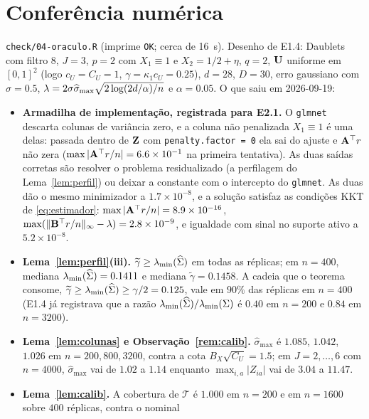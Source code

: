 \documentclass[11pt,a4paper]{article}
\newcommand{\lmin}{\lambda_{\min}}
\newcommand{\Amat}{\mathbf{A}}
\newcommand{\Bmat}{\mathbf{B}}
\newcommand{\smax}{\widehat{\sigma}_{\max}}
\newcommand{\gtil}{\widetilde{\gamma}}
\begin{document}
\section{Conferência numérica}

\texttt{check/04-oraculo.R} (imprime \texttt{OK}; cerca de 16~s). Desenho de
E1.4: Daublets com filtro 8, $J = 3$, $p = 2$ com $X_{1}\equiv 1$ e
$X_{2} = 1/2+\eta$, $q = 2$, $\mathbf{U}$ uniforme em $[0,1]^{2}$ (logo
$c_{U} = C_{U} = 1$, $\gamma = \kappa_{1}c_{U} = 0.25$), $d = 28$, $D = 30$,
erro gaussiano com $\sigma = 0.5$, $\pen = 2\sigma\smax\sqrt{2\log(2d/\alpha)/n}$
e $\alpha = 0.05$. O que saiu em 2026-09-19:

\begin{itemize}[nosep, leftmargin=*]
  \item \textbf{Armadilha de implementação, registrada para E2.1.} O
    \texttt{glmnet} descarta colunas de variância zero, e a coluna não
    penalizada $X_{1}\equiv 1$ é uma delas: passada dentro de $\mathbf{Z}$ com
    \texttt{penalty.factor = 0} ela sai do ajuste e $\Amat\T r$ não zera
    ($\max|\Amat\T r/n| = 6.6\times10^{-1}$ na primeira tentativa). As duas
    saídas corretas são resolver o problema residualizado (a perfilagem do
    Lema~\ref{lem:perfil}) ou deixar a constante com o intercepto do
    \texttt{glmnet}. As duas dão o mesmo minimizador a $1.7\times10^{-8}$, e
    a solução satisfaz as condições KKT de \eqref{eq:estimador}:
    $\max|\Amat\T r/n| = 8.9\times10^{-16}$,
    $\max(\lVert\Bmat\T r/n\rVert_{\infty} - \pen) = 2.8\times10^{-9}$, e
    igualdade com sinal no suporte ativo a $5.2\times10^{-8}$.
  \item \textbf{Lema~\ref{lem:perfil}(iii).} $\gtil \ge \lmin(\Gramhat)$ em
    todas as réplicas; em $n = 400$, mediana $\lmin(\Gramhat) = 0.1411$ e
    mediana $\gtil = 0.1458$. A cadeia que o teorema consome,
    $\gtil \ge \lmin(\Gramhat) \ge \gamma/2 = 0.125$, vale em $90\%$ das
    réplicas em $n = 400$ (E1.4 já registrava que a razão
    $\lmin(\Gramhat)/\lmin(\Gram)$ é $0.40$ em $n = 200$ e $0.84$ em
    $n = 3200$).
  \item \textbf{Lema~\ref{lem:colunas} e Observação~\ref{rem:calib}.} $\smax$
    é $1.085$, $1.042$, $1.026$ em $n = 200, 800, 3200$, contra a cota
    $B_{X}\sqrt{C_{U}} = 1.5$; em $J = 2,\dots,6$ com $n = 4000$, $\smax$ vai
    de $1.02$ a $1.14$ enquanto $\max_{i,a}|Z_{ia}|$ vai de $3.04$ a $11.47$.
  \item \textbf{Lema~\ref{lem:calib}.} A cobertura de $\mathcal{T}$ é $1.000$
    em $n = 200$ e em $n = 1600$ sobre $400$ réplicas, contra o nominal

\end{itemize}
\end{document}

